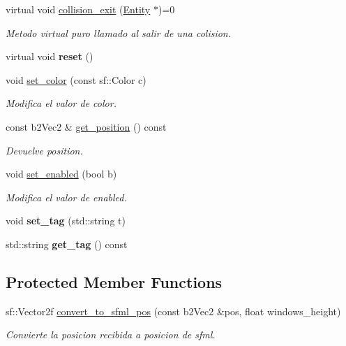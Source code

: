 \begin{DoxyCompactItemize}
virtual void \mbox{\hyperlink{classexample_1_1_entity_ae5d520b5f0dda6bb56a6c74eaf1c850c}{collision\+\_\+exit}} (\mbox{\hyperlink{classexample_1_1_entity}{Entity}} $\ast$)=0
\begin{DoxyCompactList}\small\item\em Metodo virtual puro llamado al salir de una colision. \end{DoxyCompactList}\item 
\mbox{\label{classexample_1_1_entity_a696e76a3e1e0c89bfb9961a1cac10ad3}} 
virtual void {\bfseries reset} ()
\item 
void \mbox{\hyperlink{classexample_1_1_entity_a290e01f28b2d6f738d21372145a108ed}{set\+\_\+color}} (const sf\+::\+Color c)
\begin{DoxyCompactList}\small\item\em Modifica el valor de color. \end{DoxyCompactList}\item 
const b2\+Vec2 \& \mbox{\hyperlink{classexample_1_1_entity_a0cbe31d17b04210ce4d4950937fe0002}{get\+\_\+position}} () const
\begin{DoxyCompactList}\small\item\em Devuelve position. \end{DoxyCompactList}\item 
void \mbox{\hyperlink{classexample_1_1_entity_aa36de06895a962d04571610424ebd68e}{set\+\_\+enabled}} (bool b)
\begin{DoxyCompactList}\small\item\em Modifica el valor de enabled. \end{DoxyCompactList}\item 
\mbox{\label{classexample_1_1_entity_a802f2635ff46a85c39a7dbf60411443c}} 
void {\bfseries set\+\_\+tag} (std\+::string t)
\item 
\mbox{\label{classexample_1_1_entity_a570fe3caa008749ca920749ce89eb55f}} 
std\+::string {\bfseries get\+\_\+tag} () const
\end{DoxyCompactItemize}
\subsection*{Protected Member Functions}
\begin{DoxyCompactItemize}
\item 
sf\+::\+Vector2f \mbox{\hyperlink{classexample_1_1_entity_a4cddc45f96fdd98d7b1437cd0379b6c4}{convert\+\_\+to\+\_\+sfml\+\_\+pos}} (const b2\+Vec2 \&pos, float windows\+\_\+height)
\begin{DoxyCompactList}\small\item\em Convierte la posicion recibida a posicion de sfml. \end{DoxyCompactList}\end{DoxyCompactItemize}
